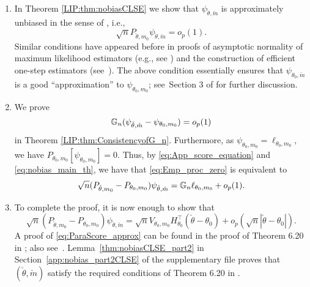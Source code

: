  
   \begin{enumerate}[label=\bfseries Step \arabic*]


  \item  In Theorem \ref{LIP:thm:nobiasCLSE} we show that $\psi_{\check{\theta},\check{m}}$ is approximately unbiased in the sense of \cite{VdV02}, i.e.,
  \begin{equation} \label{eq:nobias_main_th}
   \sqrt{n} P_{\check{\theta}, m_0} \psi_{\check{\theta},\check{m}} =o_p(1).
  \end{equation}Similar conditions have appeared before in proofs of asymptotic normality of maximum likelihood estimators (e.g., see \cite{MR1394975}) and the construction of efficient one-step estimators (see~\cite{MR913573}). The above condition essentially ensures that  ${\psi}_{\theta_0, \check{m}}$ is a good ``approximation'' to ${\psi}_{\theta_0, m_0}$; see~Section 3 of \cite{MurphyVaart00} for further discussion.\label{item:step3}

   \item We prove \label{item:step4}
  \begin{equation} \label{eq:Emp_proc_zero}
   \mathbb{G}_n ( \psi_{\check{\theta},\check{m}}- \psi_{\theta_0,m_0}) =o_p(1)
  \end{equation}
  in Theorem \ref{LIP:thm:ConsistencyofG_n}. Furthermore, as $\psi_{\theta_0,m_0}= {\ell}_{\theta_0,m_0},$ we have
  $P_{\theta_0,m_0} [\psi_{\theta_0, m_0}]=0.$
  Thus, by \eqref{eq:App_score_equation} and \eqref{eq:nobias_main_th}, we have  that \eqref{eq:Emp_proc_zero} is equivalent to
  \begin{equation}\label{eq:Final_eqpart1}
   \sqrt{n} (P_{\check{\theta}, m_0} - P_{\theta_0, m_0}) \psi_{\check{\theta},\check{m}} =\mathbb{G}_n {\ell}_{\theta_0,m_0} + o_p(1).
  \end{equation}
  \item To complete the proof, it is now enough to show that \label{item:step5}
  \begin{equation} \label{eq:ParaScore_approx}
  \sqrt{n} (P_{\check{\theta}, m_0} - P_{\theta_0, m_0}) \psi_{\check{\theta},\check{m}} = \sqrt{n}V_{\theta_0,m_0}  H_{\theta_0}^\top (\check{\theta}- \theta_0) + o_p(\sqrt{n} |\check{\theta} -\theta_0|).
  \end{equation}
  A proof of \eqref{eq:ParaScore_approx} can be found in the proof of Theorem 6.20 in \cite{VdV02}; also see~\citet[Section 10.4]{Patra16}. Lemma~\ref{thm:nobiasCLSE_part2} in  Section~\ref{app:nobias_part2CLSE} of the supplementary file
    proves that $(\check\theta, \check{m})$ satisfy the required conditions of Theorem 6.20 in \cite{VdV02}.
   \end{enumerate}
